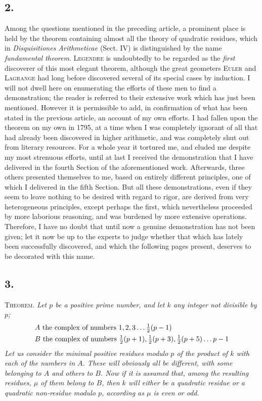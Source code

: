 \documentclass[twoside,12pt]{memoir}
\let\oldfrac\frac
\def\frac#1#2{\mathchoice{\tfrac{#1}{#2}}{\oldfrac{#1}{#2}}{\genfrac{}{}{}{2}{#1}{#2\mathstrut}}{\genfrac{}{}{}{3}{#1}{#2\mathstrut}}}
\begin{document}
\subsection*{2.}

Among the questions mentioned in the preceding article, a prominent place is held by the theorem containing almost all the theory of quadratic residues, which in  \textit{Disquisitiones Arithmeticae} (Sect. IV) is distinguished by the name \textit{fundamental \pagebreak%
theorem}. \textsc{Legendre} is undoubtedly to be regarded as the \textit{first} discoverer of this most elegant theorem, although the great geometers \textsc{Euler} and \textsc{Lagrange} had long before discovered several of its special cases by induction.   I will not dwell here on enumerating the efforts of these men to find a demonstration; the reader is referred to their extensive work which has just been mentioned.  However it is permissible to add, in confirmation of what has been stated in the previous article, an account of my own efforts.   I had fallen upon the theorem on my own in 1795, at a time when I was completely ignorant of all that had already been discovered in higher arithmetic, and was completely shut out from literary resources.  For a whole year it tortured me, and eluded me despite my most strenuous efforts, until at last I received the demonstration that I have delivered in the fourth Section of the aforementioned work.  Afterwards, three others presented themselves to me, based on entirely different principles, one of which I delivered in the fifth Section.  But all these demonstrations, even if they seem to leave nothing to be desired with regard to rigor, are derived from very heterogeneous principles, except perhaps the first, which nevertheless proceeded by more laborious reasoning, and was burdened by more extensive operations.  Therefore, I have no doubt that until now a genuine demonstration has not been given;  let it now be up to the experts to judge whether that which has lately been successfully discovered, and which the following pages present, deserves to be decorated with this name.

\subsection*{3.}

\textsc{Theorem.} \textit{Let \(p\) be a positive prime number, and let \(k\) any integer not divisible by \(p\);
\[\begin{aligned}
&A \text{ the complex of numbers }1,2,3 \ldots \frac{1}{2}(p-1)\\
&B \text{ the complex of numbers } \frac{1}{2}(p+1), \frac{1}{2}(p+3), \frac{1}{2}(p+5) \ldots p-1
\end{aligned}\]
Let us consider the minimal positive residues modulo \(p\) of the product of \(k\) with each of the numbers in \(A\).  These will obviously all be different, with some belonging to \(A\) and others to \(B\). Now if it is assumed that, among the resulting residues, \(\mu\) of them belong to \(B\), then \(k\) will either be a quadratic residue or a quadratic non-residue modulo \(p\), according as \(\mu\) is even or odd.}
\end{document}
